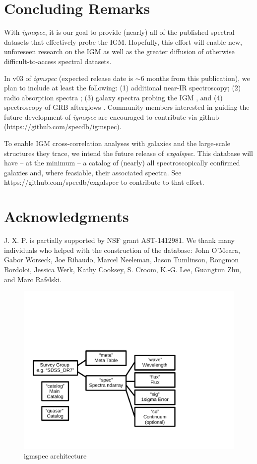 \documentclass[12pt]{elsarticle}
\begin{document}
\section{Concluding Remarks}
\label{sec:end}

With {\it igmspec}, it is our goal to provide (nearly)
all of the published spectral datasets that effectively
probe the IGM.  Hopefully, this effort will
enable new, unforeseen research on the IGM as well
as the greater diffusion of otherwise difficult-to-access spectral
datasets.  

In v03 of
{\it igmspec} (expected release date is $\sim 6$ months from
this publication), we plan to include at least the following:
(1) additional near-IR spectroscopy;
(2) radio absorption spectra \citep[e.g. 21\,cm;][]{kanekar+14};
(3) galaxy spectra probing the IGM \citep[e.g.][]{rpk+10}, 
and
(4) spectroscopy of GRB afterglows \citep[e.g.][]{fjp+09}.
Community members interested in guiding the future development
of {\it igmspec} are encouraged to contribute via github
(https://github.com/specdb/igmspec).

To enable IGM cross-correlation analyses with galaxies
and the large-scale structures they trace,
we intend the future release of {\it exgalspec}.
This database will have -- at
the minimum -- a catalog of (nearly) all spectroscopically
confirmed galaxies and, where feasiable, their associated
spectra.  See https://github.com/specdb/exgalspec
to contribute to that effort.


\section{Acknowledgments}

J. X. P. is partially supported by NSF grant AST-1412981.
We thank many individuals who helped with the construction
of the database:
John O'Meara, Gabor Worseck, Joe Ribaudo, Marcel Neeleman,
Jason Tumlinson, Rongmon Bordoloi, Jessica Werk,
Kathy Cooksey, S. Croom, K.-G. Lee, Guangtun Zhu,
and Marc Rafelski.



%
%

%
%


\begin{figure}
\includegraphics[width=6in]{architecture_v02.pdf}
\caption{igmspec architecture
}
\label{fig:arch}
\end{figure}
\end{document}
